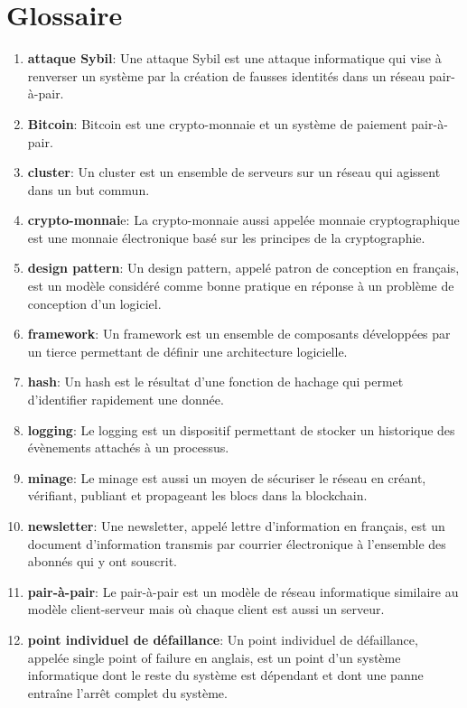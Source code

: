 \documentclass{tnreport}
\begin{document}
\chapter*{Glossaire}

\begin{enumerate}
	\item \textbf{attaque Sybil}: Une attaque Sybil est une attaque informatique qui vise à renverser un système par la création de fausses identités dans un réseau pair-à-pair.
	\item \textbf{Bitcoin}: Bitcoin est une crypto-monnaie et un système de paiement pair-à-pair.
	\item \textbf{cluster}: Un cluster est un ensemble de serveurs sur un réseau qui agissent dans un but commun.
	\item \textbf{crypto-monnai}e: La crypto-monnaie aussi appelée monnaie cryptographique est une monnaie électronique basé sur les principes de la cryptographie.
	\item \textbf{design pattern}: Un design pattern, appelé patron de conception en français, est un modèle considéré comme bonne pratique en réponse à un problème de conception d'un logiciel.
	\item \textbf{framework}: Un framework est un ensemble de composants développées par un tierce permettant de définir une architecture logicielle.
	\item \textbf{hash}: Un hash est le résultat d'une fonction de hachage qui permet d'identifier rapidement une donnée.
	\item \textbf{logging}: Le logging est un dispositif permettant de stocker un historique des évènements attachés à un processus.
	\item \textbf{minage}: Le minage est aussi un moyen de sécuriser le réseau en créant, vérifiant, publiant et propageant les blocs dans la blockchain.
	\item \textbf{newsletter}: Une newsletter, appelé lettre d'information en français, est un document d'information transmis par courrier électronique à l'ensemble des abonnés qui y ont souscrit.
	\item \textbf{pair-à-pair}: Le pair-à-pair est un modèle de réseau informatique similaire au modèle client-serveur mais où chaque client est aussi un serveur.
	\item \textbf{point individuel de défaillance}: Un point individuel de défaillance, appelée single point of failure en anglais, est un point d'un système informatique dont le reste du système est dépendant et dont une panne entraîne l'arrêt complet du système.

\end{enumerate}
\end{document}

